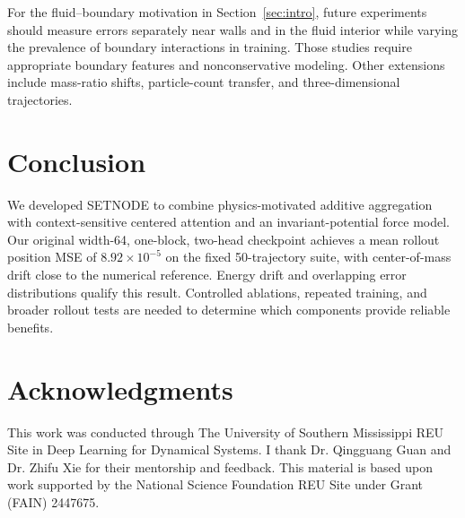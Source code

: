 \documentclass[10pt,letterpaper,twocolumn]{article}
\numberwithin{equation}{section}
\begin{document}
For the fluid--boundary motivation in Section~\ref{sec:intro}, future experiments should measure
errors separately near walls and in the fluid interior while varying the prevalence of boundary
interactions in training. Those studies require appropriate boundary features and nonconservative
modeling. Other extensions include mass-ratio shifts, particle-count transfer, and
three-dimensional trajectories.

\section{Conclusion}

We developed SETNODE to combine physics-motivated additive aggregation with context-sensitive
centered attention and an invariant-potential force model. Our original width-64, one-block,
two-head checkpoint achieves a mean rollout position MSE of $8.92\times10^{-5}$ on the fixed
50-trajectory suite, with center-of-mass drift close to the numerical reference. Energy drift and overlapping error distributions qualify this result. Controlled ablations, repeated training, and
broader rollout tests are needed to determine which components provide reliable benefits.

\section*{Acknowledgments}

This work was conducted through The University of Southern Mississippi REU Site in Deep Learning
for Dynamical Systems. I thank Dr. Qingguang Guan and Dr. Zhifu Xie for their mentorship and
feedback. This material is based upon
work supported by the National Science Foundation REU Site under Grant (FAIN) 2447675.


\FloatBarrier
\clearpage
\onecolumn
\setlength{\abovedisplayskip}{6pt plus 2pt minus 2pt}
\setlength{\belowdisplayskip}{6pt plus 2pt minus 2pt}
\setlength{\abovedisplayshortskip}{3pt plus 1pt}
\setlength{\belowdisplayshortskip}{4pt plus 1pt minus 1pt}
\end{document}
